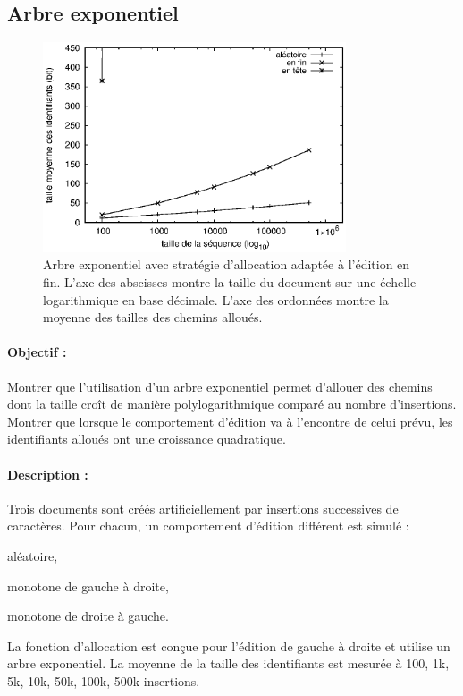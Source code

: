 \subsection{Arbre exponentiel}

\begin{figure}
  \begin{center}
    \includegraphics[width=0.8\textwidth]{img/lseq/double.eps}
    \caption[Influence de l'arbre exponentiel sur la taille des chemins]
    {\label{repl:img:exponentialtree} Arbre exponentiel avec stratégie
      d'allocation adaptée à l'édition en fin. L'axe des abscisses montre la
      taille du document sur une échelle logarithmique en base décimale. L'axe
      des ordonnées montre la moyenne des tailles des chemins alloués.}
  \end{center}
\end{figure}

\paragraph{Objectif :} Montrer que l'utilisation d'un arbre exponentiel permet
d'allouer des chemins dont la taille croît de manière polylogarithmique comparé
au nombre d'insertions. Montrer que lorsque le comportement d'édition va à
l'encontre de celui prévu, les identifiants alloués ont une croissance
quadratique.

\paragraph{Description :} Trois documents sont créés artificiellement par
insertions successives de caractères. Pour chacun, un comportement d'édition
différent est simulé :
\begin{inparaenum}[(i)]
\item aléatoire,
\item monotone de gauche à droite,
\item monotone de droite à gauche.
\end{inparaenum}
La fonction d'allocation est conçue pour l'édition de gauche à droite et utilise
un arbre exponentiel.  La moyenne de la taille des identifiants est mesurée à
100, 1k, 5k, 10k, 50k, 100k, 500k insertions. 

